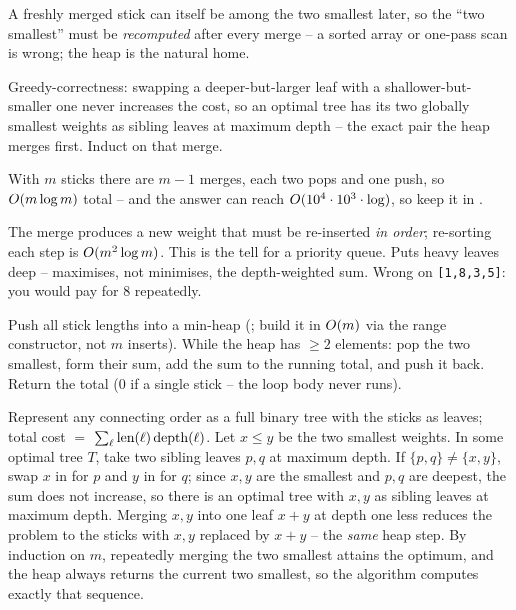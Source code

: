 \begin{observation}
A freshly merged stick can itself be among the two smallest later, so the ``two smallest'' must be
\emph{recomputed} after every merge -- a sorted array or one-pass scan is wrong; the heap is the natural
home.
\end{observation}
\begin{observation}
Greedy-correctness: swapping a deeper-but-larger leaf with a shallower-but-smaller one never increases the
cost, so an optimal tree has its two globally smallest weights as sibling leaves at maximum depth -- the exact
pair the heap merges first. Induct on that merge.
\end{observation}
\begin{observation}
With $m$ sticks there are $m-1$ merges, each two pops and one push, so $O(m\log m)$ total -- and the
answer can reach $O(10^{4}\cdot 10^{3}\cdot\log)$, so keep it in .
\end{observation}

\begin{thinkbox}
{The merge produces a new weight that must be re-inserted \emph{in order}; re-sorting each step is
$O(m^2\log m)$. This is the tell for a priority queue.}
{Puts heavy leaves deep -- maximises, not minimises, the depth-weighted sum. Wrong on \texttt{[1,8,3,5]}:
you would pay for $8$ repeatedly.}
\end{thinkbox}

Push all stick lengths into a min-heap (; build it in $O(m)$ via the range
constructor, not $m$ inserts). While the heap has $\ge 2$ elements: pop the two smallest, form their sum,
add the sum to the running total, and push it back. Return the total ($0$ if a single stick -- the loop body
never runs).

\begin{proofbox}
Represent any connecting order as a full binary tree with the sticks as leaves; total cost $=$
$\sum_\ell \text{len}(\ell)\operatorname{depth}(\ell)$. Let $x\le y$ be the two smallest weights. In some optimal tree $T$,
take two sibling leaves $p,q$ at maximum depth. If $\{p,q\}\ne\{x,y\}$, swap $x$ in for $p$ and $y$ in for
$q$; since $x,y$ are the smallest and $p,q$ are deepest, the sum does not increase, so there is an optimal
tree with $x,y$ as sibling leaves at maximum depth. Merging $x,y$ into one leaf $x{+}y$ at depth one less
reduces the problem to the sticks with $x,y$ replaced by $x{+}y$ -- the \emph{same} heap step. By induction on
$m$, repeatedly merging the two smallest attains the optimum, and the heap always returns the current two
smallest, so the algorithm computes exactly that sequence. \end{proofbox}

